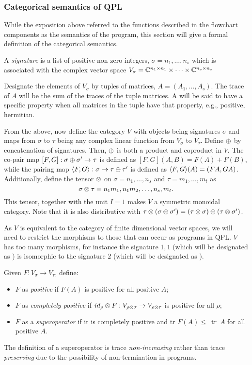\subsubsection{Categorical semantics of QPL}\label{sec:catsemanticsofqpl}
While the exposition above referred to the functions described in the flowchart components as the
semantics of the program, this section will give a formal definition of the categorical semantics.

\begin{definition}[Signature]\label{def:signature}
  A \emph{signature} is a list of positive non-zero integers, $\sigma=n_{1},\ldots,n_{s}$ which is
  associated with the complex vector space $V_{\sigma}=\mathbb{C}^{n_{1}\times
  n_{1}}\times\cdots\times\mathbb{C}^{n_{s}\times n_{s}}$
\end{definition}
Designate the elements of $V_{\sigma}$ by tuples of matrices, $A=(A_{1},\ldots,A_{s})$. The trace
of $A$ will be the sum of the traces of the tuple matrices. A will be said to have a specific
property when all matrices in the tuple have that property, e.g., positive, hermitian.

From the above, now define the category $V$ with objects being signatures $\sigma$ and maps from
$\sigma$ to $\tau$ being any complex linear function from $V_{\sigma}$ to $V_{\tau}$. Define $\oplus$
by concatenation of signatures. Then, $\oplus$ is both a product and coproduct in $V$. The co-pair map
$[F,G]:\sigma\oplus\sigma' \to \tau$ is defined as $[F,G](A,B) = F(A)+F(B)$, while the pairing map
$\langle F,G\rangle:\sigma \to \tau\oplus\tau'$ is defined as $\langle F,G\rangle(A)=(FA,GA)$. Additionally, define the
tensor $\otimes$ on $\sigma=n_{1},\ldots,n_{s}$ and $\tau=m_{1},\ldots,m_{t}$ as \[\sigma\otimes\tau =
n_{1}m_{1},n_{1}m_{2},\ldots,n_{s},m_{t}.\] This tensor, together with the unit $I=1$ makes $V$ a
symmetric monoidal category. Note that it is also distributive with $\tau\otimes(\sigma \oplus\sigma') =
(\tau\otimes\sigma)\oplus(\tau\otimes\sigma')$.

As $V$ is equivalent to the category of finite dimensional vector spaces, we will need to restrict
the morphisms to those that can occur as programs in QPL. $V$ has too many morphisms, for instance
the signature $1,1$ (which will be designated as \bit) is isomorphic to the signature $2$ (which
will be designated as \qbit).

\begin{definition}[Superoperator]
  Given $F:V_{\sigma}\to V_{\tau}$, define:
  \begin{itemize}
    \item $F$ as \emph{positive} if $F(A)$ is positive for all positive $A$;
    \item $F$ as \emph{completely positive} if $id_{\rho}\otimes F:V_{\rho\otimes\sigma}\to V_{\rho\otimes\tau}$ is
      positive for all $\rho$;
    \item $F$ as a \emph{superoperator} if it is completely positive and $\text{tr }F(A)\le$~tr~$A$
      for all positive $A$.
  \end{itemize}
\end{definition}
The definition of a superoperator is trace \emph{non-increasing} rather than trace
\emph{preserving} due to the possibility of non-termination in programs.

